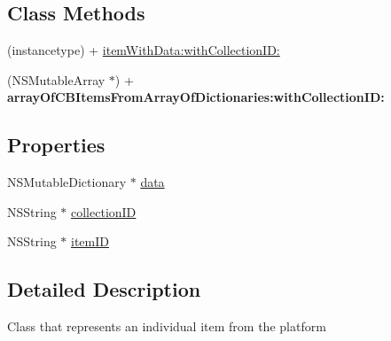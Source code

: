 \subsection*{Class Methods}
\begin{DoxyCompactItemize}
\item 
(instancetype) + \hyperlink{interface_c_b_item_a5f9b22377c54afcb79916eaa66108140}{item\+With\+Data\+:with\+Collection\+I\+D\+:}
\item 
\hypertarget{interface_c_b_item_ab370a3dfb1ce240b8c59b41436532e56}{(N\+S\+Mutable\+Array $\ast$) + {\bfseries array\+Of\+C\+B\+Items\+From\+Array\+Of\+Dictionaries\+:with\+Collection\+I\+D\+:}}\label{interface_c_b_item_ab370a3dfb1ce240b8c59b41436532e56}

\end{DoxyCompactItemize}
\subsection*{Properties}
\begin{DoxyCompactItemize}
\item 
N\+S\+Mutable\+Dictionary $\ast$ \hyperlink{interface_c_b_item_a056a3d35cb718cb306dc69915bec29e2}{data}
\item 
N\+S\+String $\ast$ \hyperlink{interface_c_b_item_a8d47dba1bcfeb0754b65d312a48a939a}{collection\+I\+D}
\item 
N\+S\+String $\ast$ \hyperlink{interface_c_b_item_adc7d0932fa46e75354e7dbe63d714165}{item\+I\+D}
\end{DoxyCompactItemize}


\subsection{Detailed Description}
Class that represents an individual item from the platform 

